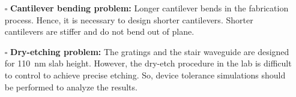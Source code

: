 \documentclass[../report.tex]{subfiles}
\begin{document}
\begin{itemize}
	\item[$\square$] \textbf{Cantilever bending problem:} Longer cantilever bends in the fabrication process. Hence,  it is necessary to design shorter cantilevers. Shorter cantilevers are stiffer and do not bend out of plane.
	
	\item[$\square$] \textbf{Dry-etching problem:} The gratings and the stair waveguide are designed for \SI{110}{\nano \meter} slab height. However, the dry-etch procedure in the lab is difficult to control to achieve precise etching. So, device tolerance simulations should be performed to analyze the results.  
	
\end{itemize} 
	
\end{document}

